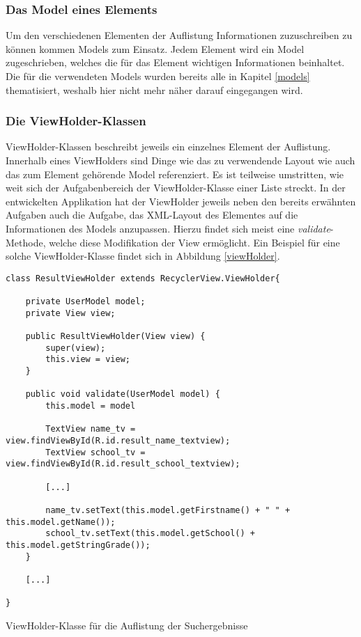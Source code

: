 \documentclass[../main.tex]{subfiles}
\begin{document}
	\subsubsection{Das Model eines Elements}
	Um den verschiedenen Elementen der Auflistung Informationen zuzuschreiben zu können kommen Models zum Einsatz. Jedem Element wird ein Model zugeschrieben, welches die für das Element wichtigen Informationen beinhaltet. Die für die verwendeten Models wurden bereits alle in Kapitel \ref{models} thematisiert, weshalb hier nicht mehr näher darauf eingegangen wird.
	
	\subsubsection{Die ViewHolder-Klassen}
	ViewHolder-Klassen beschreibt jeweils ein einzelnes Element der Auflistung. Innerhalb eines ViewHolders sind Dinge wie das zu verwendende Layout wie auch das zum Element gehörende Model referenziert. Es ist teilweise umstritten, wie weit sich der Aufgabenbereich der ViewHolder-Klasse einer Liste streckt. In der entwickelten Applikation hat der ViewHolder jeweils neben den bereits erwähnten Aufgaben auch die Aufgabe, das XML-Layout des Elementes auf die Informationen des Models anzupassen. Hierzu findet sich meist eine \emph{validate}-Methode, welche diese Modifikation der View ermöglicht. Ein Beispiel für eine solche ViewHolder-Klasse findet sich in Abbildung \ref{viewHolder}.

\begin{code}
	\begin{center}
		\begin{verbatim}
class ResultViewHolder extends RecyclerView.ViewHolder{
	
	private UserModel model;
	private View view;
	
	public ResultViewHolder(View view) {
		super(view);
		this.view = view;
	}
	
	public void validate(UserModel model) {
		this.model = model
	
		TextView name_tv = view.findViewById(R.id.result_name_textview);
		TextView school_tv = view.findViewById(R.id.result_school_textview);
		
		[...]
		
		name_tv.setText(this.model.getFirstname() + " " + this.model.getName());
		school_tv.setText(this.model.getSchool() + this.model.getStringGrade());
	}
	
	[...]
	
}
		\end{verbatim}
		\caption{ViewHolder-Klasse für die Auflistung der Suchergebnisse}
		\label{viewHolder}
	\end{center}
\end{code}
\end{document}
